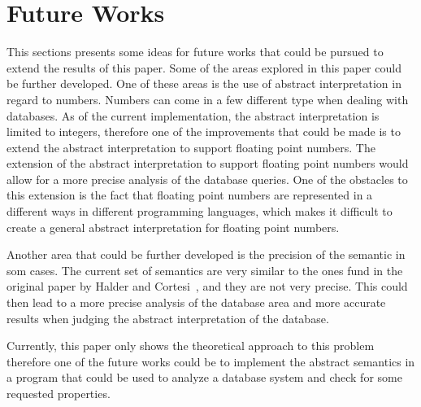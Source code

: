 \section{Future Works}\label{sec:future-works}
This sections presents some ideas for future works that could be pursued to extend the results of this paper.
Some of the areas explored in this paper could be further developed.
One of these areas is the use of abstract interpretation in regard to numbers.
Numbers can come in a few different type when dealing with databases.
As of the current implementation, the abstract interpretation is limited to integers, therefore one of the improvements that could be made is to extend the abstract interpretation to support floating point numbers.
The extension of the abstract interpretation to support floating point numbers would allow for a more precise analysis of the database queries.
One of the obstacles to this extension is the fact that floating point numbers are represented in a different ways in different programming languages, which makes it difficult to create a general abstract interpretation for floating point numbers.

Another area that could be further developed is the precision of the semantic in som cases.
The current set of semantics are very similar to the ones fund in the original paper by Halder and Cortesi~\cite{halder_abstract_2012}, and they are not very precise.
This could then lead to a more precise analysis of the database area and more accurate results when judging the abstract interpretation of the database.

Currently, this paper only shows the theoretical approach to this problem therefore one of the future works could be to implement the abstract semantics in a program that could be used to analyze a database system and check for some requested properties.